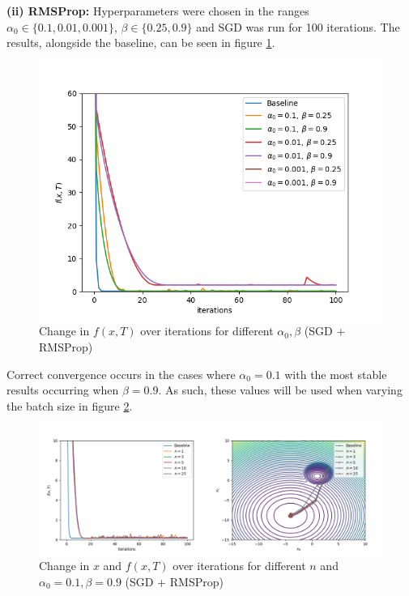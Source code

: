 \documentclass[12pt]{article}
\begin{document}
\vspace{3mm}
\noindent \textbf{(ii) RMSProp:} Hyperparameters were chosen in the ranges $\alpha_0 \in \{0.1,0.01,0.001\}$, $\beta \in \{0.25,0.9\}$ and SGD was run for 100 iterations. The results, alongside the baseline, can be seen in figure \ref{fig:c_ii_params}.

\begin{figure}[h]
    \centering
    \includegraphics[scale=0.6]{figs/c/c_ii_params.png}
    \caption{Change in $f(x, T)$ over iterations for different $\alpha_0,\beta$ (SGD + RMSProp)}
    \label{fig:c_ii_params}
\end{figure}

Correct convergence occurs in the cases where $\alpha_0 = 0.1$ with the most stable results occurring when $\beta=0.9$. As such, these values will be used when varying the batch size in figure \ref{fig:c_ii}.

\begin{figure}[h]
    \hspace*{-0.45in}
    \includegraphics[scale=1.75]{figs/c/c_ii.png}
    \caption{Change in $x$ and $f(x, T)$ over iterations for different $n$ and $\alpha_0=0.1,\beta=0.9$ (SGD + RMSProp)}
    \label{fig:c_ii}
\end{figure}
\end{document}
